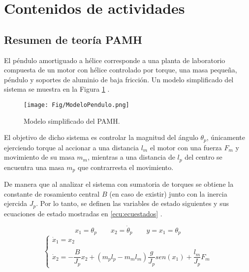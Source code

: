 \documentclass[12pt]{article}
\begin{document}

\section*{Contenidos de actividades}

\subsection*{Resumen de teoría PAMH}

El péndulo amortiguado a hélice corresponde a una planta de laboratorio compuesta de un motor con hélice controlado por torque, una masa pequeña, péndulo y soportes de aluminio de baja fricción. Un modelo simplificado del sistema se muestra en la Figura \ref{fig:modpen} \cite{PAMH1}.

\begin{figure}[h]
	\centering
	\texttt{[image: Fig/ModeloPendulo.png]}
	\caption{Modelo simplificado del PAMH.}
	\label{fig:modpen}
\end{figure}

El objetivo de dicho sistema es controlar la magnitud del ángulo $\theta_p$, únicamente ejerciendo torque al accionar a una distancia $l_m$ el motor con una fuerza $F_m$ y movimiento de su masa $m_m$, mientras a una distancia de $l_p$ del centro se encuentra una masa $m_p$ que contrarresta el movimiento.

De manera que al analizar el sistema con sumatoria de torques se obtiene la constante de rosamiento central $B$ (en caso de existir) junto con la inercia ejercida $J_p$. Por lo tanto, se definen las variables de estado siguientes y sus ecuaciones de estado mostradas en \ref{ecu:ecuestados} \cite{ControlModerno}.

\[x_1 = \theta_p \qquad x_2 = \dot{\theta}_p \qquad y = x_1 = \theta_p\]
\begin{equation}
	\left \{ \begin{array}{lcc} \dot{x}_1 = x_2 \\ \\ \dot{x}_2 = -\dfrac{B}{J_p} x_2 + (m_p l_p -m_m l_m)\dfrac{g}{J_p}sen(x_1) +\dfrac{l_m}{J_p}F_m \end{array} \right.
	\label{ecu:ecuestados}
\end{equation}
\end{document}
